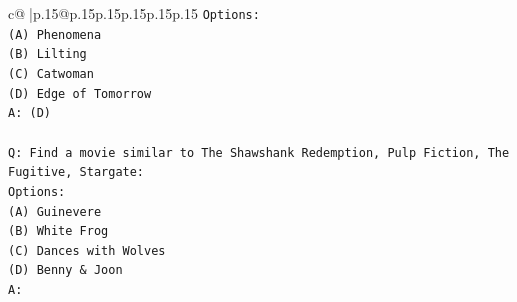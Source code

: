 \documentclass{article}
\begin{document}
{\begin{supertabular}{c@{$\;$}|p{.15\linewidth}@{}p{.15\linewidth}p{.15\linewidth}p{.15\linewidth}p{.15\linewidth}p{.15\linewidth}}
{{{\texttt{Options:} \\
\texttt{(A) Phenomena} \\
\texttt{(B) Lilting} \\
\texttt{(C) Catwoman} \\
\texttt{(D) Edge of Tomorrow} \\
\texttt{A: (D)} \\
\\ 
\texttt{Q: Find a movie similar to The Shawshank Redemption, Pulp Fiction, The Fugitive, Stargate:} \\
\texttt{Options:} \\
\texttt{(A) Guinevere} \\
\texttt{(B) White Frog} \\
\texttt{(C) Dances with Wolves} \\
\texttt{(D) Benny \& Joon} \\
\texttt{A:} \\
            }
        }
    }
     \\ \\


\end{supertabular}}
\end{document}
